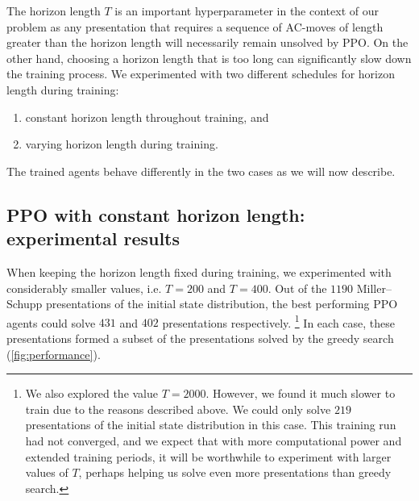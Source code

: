 The horizon length $T$ is an important hyperparameter in the context of our problem as any presentation that requires a sequence of AC-moves of length greater than the horizon length will necessarily remain unsolved by PPO. On the other hand, choosing a horizon length that is too long can significantly slow down the training process. We experimented with two different schedules for horizon length during training: 
\begin{enumerate}[label=(\roman*)]
    \item constant horizon length throughout training, and
    \item varying horizon length during training. 
\end{enumerate}

The trained agents behave differently in the two cases as we will now describe.

\subsection{PPO with constant horizon length: experimental results} When keeping the horizon length fixed during training, we experimented with considerably smaller values, i.e. $T=200$ and $T=400$. Out of the $1190$ Miller--Schupp presentations of the initial state distribution, the best performing PPO agents could solve $431$ and $402$ presentations respectively. \footnote{We also explored the value $T=2000$. However, we found it much slower to train due to the reasons described above. We could only solve $219$ presentations of the initial state distribution in this case. This training run had not converged, and we expect that with more computational power and extended training periods, it will be worthwhile to experiment with larger values of $T$, perhaps helping us solve even more presentations than greedy search.}
In each case, these presentations formed a subset of the presentations solved by the greedy search (\cref{fig:performance}).

